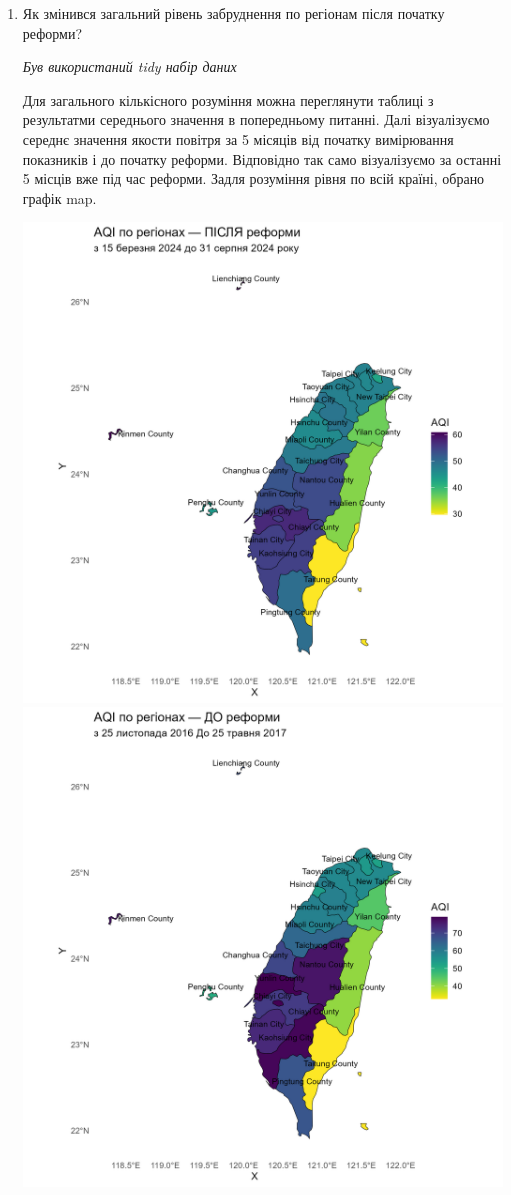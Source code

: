 \documentclass{article}
\begin{document}
\begin{enumerate}
    \item Як змінився загальний рівень забруднення по регіонам після початку реформи?
    
    \quad \textit{Був використаний tidy набір даних}

    Для загального кількісного розуміння можна переглянути таблиці з результатми середнього значення в попередньому питанні. 
    Далі візуалізуємо середнє значення якости повітря за 5 місяців від початку вимірювання показників і до початку реформи. Відповідно так само візуалізуємо за останні 5 місців вже під час реформи. 
    Задля розуміння рівня по всій країні, обрано графік map. 
    
    \begin{center}
    \includegraphics[width=6in]{question5/map_after_reform.png}
    \includegraphics[width=6in]{question5/map_before_reform.png}

\end{center}
\end{enumerate}
\end{document}
